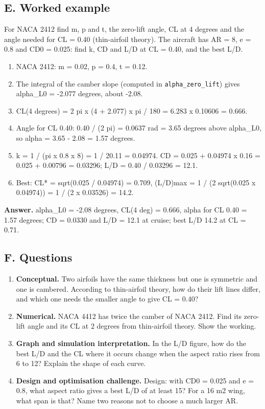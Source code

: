 \documentclass[11pt,a4paper]{article}
\begin{document}
\subsection*{E. Worked example}
For NACA 2412 find m, p and t, the zero-lift angle, CL at 4 degrees and the angle needed for CL = 0.40 (thin-airfoil theory). The aircraft has AR = 8, e = 0.8 and CD0 = 0.025: find k, CD and L/D at CL = 0.40, and the best L/D.
\begin{enumerate}[nosep]
\item NACA 2412: m = 0.02, p = 0.4, t = 0.12.
\item The integral of the camber slope (computed in \texttt{alpha\_zero\_lift}) gives alpha\_L0 = -2.077 degrees, about -2.08.
\item CL(4 degrees) = 2 pi x (4 + 2.077) x pi / 180 = 6.283 x 0.10606 = 0.666.
\item Angle for CL 0.40: 0.40 / (2 pi) = 0.0637 rad = 3.65 degrees above alpha\_L0, so alpha = 3.65 - 2.08 = 1.57 degrees.
\item k = 1 / (pi x 0.8 x 8) = 1 / 20.11 = 0.04974. CD = 0.025 + 0.04974 x 0.16 = 0.025 + 0.00796 = 0.03296; L/D = 0.40 / 0.03296 = 12.1.
\item Best: CL* = sqrt(0.025 / 0.04974) = 0.709, (L/D)max = 1 / (2 sqrt(0.025 x 0.04974)) = 1 / (2 x 0.03526) = 14.2.
\end{enumerate}
\textbf{Answer.} alpha\_L0 = -2.08 degrees, CL(4 deg) = 0.666, alpha for CL 0.40 = 1.57 degrees; CD = 0.0330 and L/D = 12.1 at cruise; best L/D 14.2 at CL = 0.71.

\subsection*{F. Questions}
\begin{enumerate}[nosep]
\item \textbf{Conceptual.} Two airfoils have the same thickness but one is symmetric and one is cambered. According to thin-airfoil theory, how do their lift lines differ, and which one needs the smaller angle to give CL = 0.40?
\item \textbf{Numerical.} NACA 4412 has twice the camber of NACA 2412. Find its zero-lift angle and its CL at 2 degrees from thin-airfoil theory. Show the working.
\item \textbf{Graph and simulation interpretation.} In the L/D figure, how do the best L/D and the CL where it occurs change when the aspect ratio rises from 6 to 12? Explain the shape of each curve.
\item \textbf{Design and optimisation challenge.} Design: with CD0 = 0.025 and e = 0.8, what aspect ratio gives a best L/D of at least 15? For a 16 m2 wing, what span is that? Name two reasons not to choose a much larger AR.
\end{enumerate}
\end{document}
